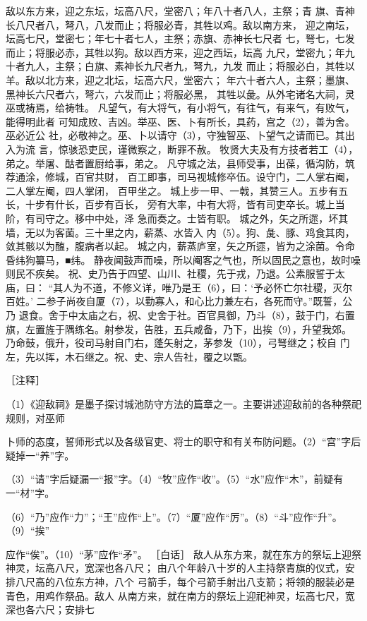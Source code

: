 \documentclass[12pt,UTF8]{ctexbook}
\begin{document}
 敌以东方来，迎之东坛，坛高八尺，堂密八；年八十者八人，主祭；青 
旗、青神长八尺者八，弩八，八发而止；将服必青，其牲以鸡。敌以南方来， 
迎之南坛，坛高七尺，堂密七；年七十者七人，主祭；赤旗、赤神长七尺者 
七，弩七，七发而止；将服必赤，其牲以狗。敌以西方来，迎之西坛，坛高 
九尺，堂密九；年九十者九人，主祭；白旗、素神长九尺者九，弩九，九发 
而止；将服必白，其牲以羊。敌以北方来，迎之北坛，坛高六尺，堂密六； 
年六十者六人，主祭；墨旗、黑神长六尺者六，弩六，六发而止；将服必黑， 
其牲以彘。从外宅诸名大祠，灵巫或祷焉，给祷牲。 
凡望气，有大将气，有小将气，有往气，有来气，有败气，能得明此者 
可知成败、吉凶。举巫、医、卜有所长，具药，宫之（2），善为舍。巫必近公 
社，必敬神之。巫、卜以请守（3），守独智巫、卜望气之请而已。其出入为流 
言，惊骇恐吏民，谨微察之，断罪不赦。 
牧贤大夫及有方技者若工（4），弟之。举屠、酤者置厨给事，弟之。 
凡守城之法，县师受事，出葆，循沟防，筑荐通涂，修城，百官共财， 
百工即事，司马视城修卒伍。设守门，二人掌右阉，二人掌左阉，四人掌闭， 
百甲坐之。 
城上步一甲、一戟，其赞三人。五步有五长，十步有什长，百步有百长， 
旁有大率，中有大将，皆有司吏卒长。城上当阶，有司守之。移中中处，泽 
急而奏之。士皆有职。 
城之外，矢之所遝，坏其墙，无以为客菌。三十里之内，薪蒸、水皆入 
内（5）。狗、彘、豚、鸡食其肉，敛其骸以为醢，腹病者以起。 
城之内，薪蒸庐室，矢之所遝，皆为之涂菌。令命昏纬狗纂马，■纬。 
静夜闻鼓声而噪，所以阉客之气也，所以固民之意也，故时噪则民不疾矣。 
祝、史乃告于四望、山川、社稷，先于戎，乃退。公素服誓于太庙，曰： 
“其人为不道，不修义详，唯乃是王（6），曰：‘予必怀亡尔社稷，灭尔百姓。’ 
二参子尚夜自厦（7），以勤寡人，和心比力兼左右，各死而守。”既誓，公乃 
退食。舍于中太庙之右，祝、史舍于社。百官具御，乃斗（8），鼓于门，右置 
旗，左置旌于隅练名。射参发，告胜，五兵咸备，乃下，出挨（9），升望我郊。 
乃命鼓，俄升，役司马射自门右，蓬矢射之，茅参发（10），弓弩继之；校自 
门左，先以挥，木石继之。祝、史、宗人告社，覆之以甑。 


［注释］ 

（1）《迎敌祠》是墨子探讨城池防守方法的篇章之一。主要讲述迎敌前的各种祭祀规则，对巫师 

卜师的态度，誓师形式以及各级官吏、将士的职守和有关布防问题。（2）“宫”字后疑掉一“养”字。 

（3）“请”字后疑漏一“报”字。（4）“牧”应作“收”。（5）“水”应作“木”，前疑有一“材”字。 

（6）“乃”应作“力”；“王”应作“上”。（7）“厦”应作“厉”。（8）“斗”应作“升”。（9）“挨” 

应作“俟”。（10）“茅”应作“矛”。 
［白话］ 
敌人从东方来，就在东方的祭坛上迎祭神灵，坛高八尺，宽深也各八尺； 
由八个年龄八十岁的人主持祭青旗的仪式，安排八尺高的八位东方神，八个 
弓箭手，每个弓箭手射出八支箭；将领的服装必是青色，用鸡作祭品。敌人 
从南方来，就在南方的祭坛上迎祀神灵，坛高七尺，宽深也各六尺；安排七 
\end{document}
